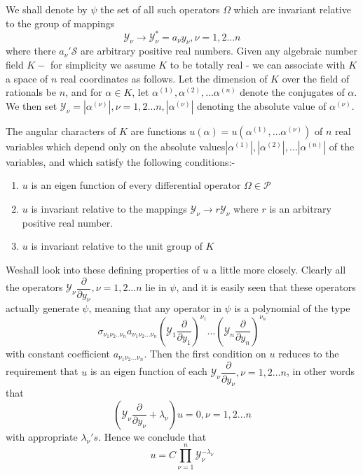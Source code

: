 We shall denote by $\psi$ the set of all such operators
$\Omega$ which are invariant relative to the group of mappings
$$
\mathscr{Y}_\nu \rightarrow \mathscr{Y}^*_\nu  = a_\nu y_\nu , \nu =
1, 2 \ldots n 
$$
where there $a_\nu '\mathscr{S}$ are arbitrary positive real
numbers. Given any algebraic number field $K-$ for simplicity we
assume $K$ to be totally real - we can associate with $K$ a space of
$n$ real coordinates as follows. Let the dimension of $K$ over the
field of rationals be $n$, and for $\alpha \in K$, let $\alpha^{(1)} ,
\alpha^{(2)}, \ldots \alpha^{(n)} $ denote the conjugates of
$\alpha$. We then set $\mathscr{Y}_\nu = |\alpha^{(\nu)}| , \nu = 1, 2
\ldots n , |\alpha^{(\nu)}|$  denoting the absolute value of
$\alpha^{(\nu)}$. 

The angular characters of $K$ are functions \; $u (\alpha) = u
(\alpha^{(1)}, \ldots \alpha^{(\nu)})$ of $n$ real variables which
depend only on the absolute values\break $|\alpha^{(1)}| , |\alpha^{(2)}|,
\ldots |\alpha^{(n)}|$ of the variables, and which satisfy the
following conditions:- 
\begin{enumerate}
\item $u$ is an eigen function of every differential operator $\Omega
  \in \mathscr{P}$ 

\item $u$ is invariant relative to the mappings $\mathscr{Y}_\nu
  \rightarrow r \mathscr{Y}_\nu$ where $r$ is an arbitrary positive
  real number. 

\item $u$ is invariant relative to the unit group of $K$ 
\end{enumerate}

We\pageoriginale shall look into these defining properties of $u$ a
little more 
closely. Clearly all the operators $\mathscr{Y}_\nu
\dfrac{\partial}{\partial y_\nu}, \nu = 1,2 \ldots n$ lie in
$\psi$, and it is easily seen that these operators actually
generate $\psi$, meaning that any operator in $\psi$ is
a polynomial of the type  
$$
\sigma_{\nu_1 \nu_2 .. \nu_n} a_{\nu_1 \nu_2 \ldots \nu_n}
(\mathscr{Y}_1 \frac{\partial}{\partial y_1})^{\nu_1} \ldots
(\mathscr{Y}_n \frac{\partial}{\partial y_n})^{\nu_n} 
$$
with constant coefficient $a_{\nu_1 \nu_2 \ldots \nu_n}$. Then the
first condition on $u$ reduces to the requirement that $u$ is an eigen
function of each $ \mathscr{Y}_\nu \dfrac{\partial}{\partial y_\nu} ,
\nu = 1,2 \ldots n$, in other words that  
$$
(\mathscr{Y}_\nu \frac{\partial}{\partial y_\nu} +  \lambda_\nu) u =
0, \nu = 1,2 \ldots n 
$$
with appropriate $\lambda_\nu 's$. Hence we conclude that  
\begin{equation*}
u = C \prod^n_{\nu = 1} \mathscr{Y}^{- \lambda_\nu}_\nu \tag{351}\label{eq351} 
\end{equation*}

